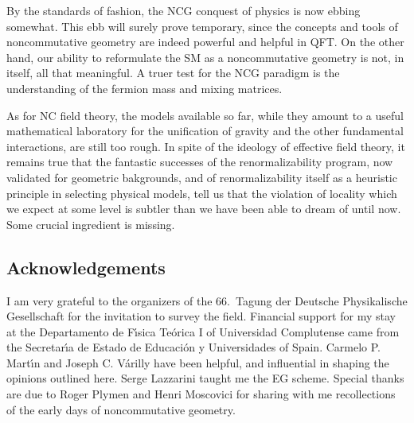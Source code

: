 \documentclass[a4paper,12pt]{article}
\newcommand{\1}{\mathbf{1}}         %
\newcommand{\7}{\dagger}            %
\newcommand{\8}{\bullet}            %
\renewcommand{\.}{\cdot}            %
\renewcommand{\:}{\colon}           %
\begin{document}
By the standards of fashion, the NCG conquest of physics is now ebbing
somewhat. This ebb will surely prove temporary, since the concepts and
tools of noncommutative geometry are indeed powerful and helpful in
QFT. On the other hand, our ability to reformulate the SM as a
noncommutative geometry is not, in itself, all that meaningful. A
truer test for the NCG paradigm is the understanding of the fermion
mass and mixing matrices.

As for NC field theory, the models available so far, while they amount
to a useful mathematical laboratory for the unification of gravity and the
other fundamental interactions, are still too rough. In spite of the
ideology of effective field theory, it remains true that the fantastic
successes of the renormalizability program, now validated for
geometric bakgrounds, and of renormalizability itself as a heuristic
principle in selecting physical models, tell us that the violation of
locality which we expect at some level is subtler than we have been
able to dream of until now. Some crucial ingredient is missing.


\subsection*{Acknowledgements}

I am very grateful to the organizers of the 66.~Tagung der Deutsche
Physikalische Gesellschaft for the invitation to survey the field.
Financial support for my stay at the Departamento de F\'{\i}sica
Te\'orica I of Universidad Complutense came from the Secretar\'{\i}a
de Estado de Educaci\'on y Universidades of Spain. Carmelo P.
Mart\'{\i}n and Joseph C. V\'arilly have been helpful, and influential
in shaping the opinions outlined here. Serge Lazzarini taught me the
EG scheme. Special thanks are due to Roger Plymen and Henri
Moscovici for sharing with me recollections of the early days of
noncommutative geometry.
\end{document}
